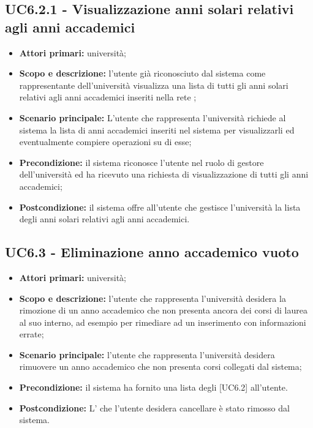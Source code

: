 \documentclass[AnalisiDeiRequisiti.tex]{subfiles}
\begin{document}
\subsection{UC6.2.1 - Visualizzazione anni solari relativi agli anni accademici}
\begin{itemize}
	\item \textbf{Attori primari:} università;
	\item \textbf{Scopo e descrizione:} l'utente già riconosciuto dal sistema come rappresentante dell'università visualizza una lista di tutti gli anni solari relativi agli anni accademici inseriti nella rete ;
	\item \textbf{Scenario principale:} L'utente che rappresenta l'università richiede al sistema la lista di anni accademici inseriti nel sistema per visualizzarli ed eventualmente compiere operazioni su di esse;
	\item \textbf{Precondizione:} il sistema riconosce l'utente nel ruolo di gestore dell'università ed ha ricevuto una richiesta di visualizzazione di tutti gli anni accademici;
	\item \textbf{Postcondizione:} il sistema offre all'utente che gestisce l'università la lista degli anni solari relativi agli anni accademici.
\end{itemize}

\subsection{UC6.3 - Eliminazione anno accademico vuoto}
\begin{itemize}
	\item \textbf{Attori primari:} università;
	\item \textbf{Scopo e descrizione:} l'utente che rappresenta l'università desidera la rimozione di un anno accademico che non presenta ancora dei corsi di laurea al suo interno, ad esempio per rimediare ad un inserimento con informazioni errate;
	\item \textbf{Scenario principale:} l'utente che rappresenta l'università desidera rimuovere un anno accademico che non presenta corsi collegati dal sistema;
	\item \textbf{Precondizione:} il sistema ha fornito una lista degli  [UC6.2] all'utente.
	\item \textbf{Postcondizione:} L' che l'utente desidera cancellare è stato rimosso dal sistema.
\end{itemize}
\end{document}
